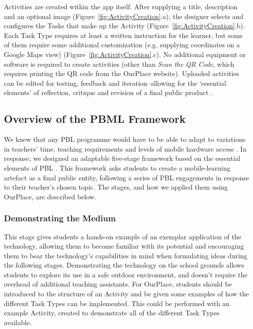 \documentclass[,hyphens]{sigchi}
\begin{document}
Activities are created within the app itself. After supplying a title, description and an optional image (Figure~\ref{fig:ActivityCreation}.a), the designer selects and configures the Tasks that make up the Activity (Figure~\ref{fig:ActivityCreation}.b). Each Task Type requires at least a written instruction for the learner, but some of them require some additional customization (e.g. supplying coordinates on a Google Maps view) (Figure~\ref{fig:ActivityCreation}.c). No additional equipment or software is required to create activities (other than \textit{Scan the QR Code}, which requires printing the QR code from the OurPlace website). Uploaded activities can be edited for testing, feedback and iteration--allowing for the `essential elements' of reflection, critique and revision of a final public product \cite{Larmer2015}. 

\subsection{Overview of the PBML Framework}

We knew that any PBL programme would have to be able to adapt to variations in teachers' time, teaching requirements and levels of mobile hardware access \cite{Blumenfeld1991, Krajcik2006, InnovationUnit2016, TheEducationEndowmentFoundation2016}. In response, we designed an adaptable five-stage framework based on the essential elements of PBL \cite{Larmer2015}. This framework asks students to create a mobile-learning artefact as a final public entity, following a series of PBL engagements in response to their teacher's chosen topic. The stages, and how we applied them using OurPlace, are described below.

\subsubsection{Demonstrating the Medium}
This stage gives students a hands-on example of an exemplar application of the technology, allowing them to become familiar with its potential and encouraging them to bear the technology's capabilities in mind when formulating ideas during the following stages. Demonstrating the technology on the school grounds allows students to explore its use in a safe outdoor environment, and doesn't require the overhead of additional teaching assistants. For OurPlace, students should be introduced to the structure of an Activity and be given some examples of how the different Task Types can be implemented. This could be performed with an example Activity, created to demonstrate all of the different Task Types available.
\end{document}
